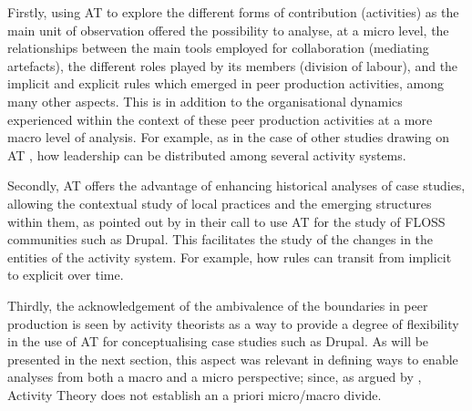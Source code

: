 Firstly, using AT to explore the different forms of contribution (activities) as the main unit of observation offered the possibility to analyse, at a micro level, the relationships between the main tools employed for collaboration (mediating artefacts), the different roles played by its members (division of labour), and the implicit and explicit rules which emerged in peer production activities, among many other aspects. This is in addition to the organisational dynamics experienced within the context of these peer production activities at a more macro level of analysis. For example, as in the case of other studies drawing on AT  \parencite{yuen2015distributed}, how leadership can be distributed among several activity systems.

Secondly, AT offers the advantage of enhancing historical analyses of case studies, allowing the contextual study of local practices and the emerging structures within them, as pointed out by \textcite{Uden2007} in their call to use AT for the study of FLOSS communities such as Drupal. This facilitates the study of the changes in the entities of the activity system. For example, how rules can transit from implicit to explicit over time.

Thirdly, the acknowledgement of the ambivalence of the boundaries in peer production is seen by activity theorists as a way to provide a degree of flexibility in the use of AT for conceptualising case studies such as Drupal. As will be presented in the next section, this aspect was relevant in defining ways to enable analyses from both a macro and a micro perspective; since, as argued by \textcite{miettinen1999riddle}, Activity Theory does not establish an a priori micro/macro divide.

